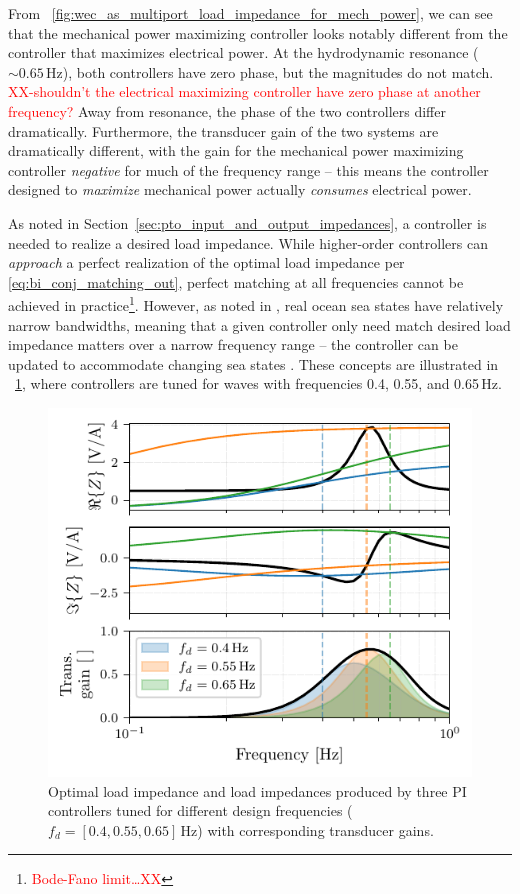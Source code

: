 \documentclass[lettersize,journal]{IEEEtran}
\newcommand{\rc}[1]{\textcolor{red}{#1}}
\begin{document}
\noindent{}From \figurename~\ref{fig:wec_as_multiport_load_impedance_for_mech_power}, we can see that the mechanical power maximizing controller looks notably different from the controller that maximizes electrical power.
At the hydrodynamic resonance ($\sim 0.65$\,Hz), both controllers have zero phase, but the magnitudes do not match.
\rc{XX-shouldn't the electrical maximizing controller have zero phase at another frequency?}
Away from resonance, the phase of the two controllers differ dramatically.
Furthermore, the transducer gain of the two systems are dramatically different, with the gain for the mechanical power maximizing controller \emph{negative} for much of the frequency range -- this means the controller designed to \emph{maximize} mechanical power actually \emph{consumes} electrical power.

As noted in Section~\ref{sec:pto_input_and_output_impedances}, a controller is needed to realize a desired load impedance.
While higher-order controllers can \emph{approach} a perfect realization of the optimal load impedance per \eqref{eq:bi_conj_matching_out}, perfect matching at all frequencies cannot be achieved in practice\footnote{\rc{Bode-Fano limit\dots{}XX}}.
However, as noted in \cite{Coe2020a}, real ocean sea states have relatively narrow bandwidths, meaning that a given controller only need match desired load impedance matters over a narrow frequency range -- the controller can be updated to accommodate changing sea states \cite{Forbush:2022aa}.
These concepts are illustrated in \figurename~\ref{fig:gfx/wec_as_multiport_pi_controllers_real_imag}, where controllers are tuned for waves with frequencies 0.4, 0.55, and 0.65\,Hz.

\begin{figure}[tb]
        \centering
        \includegraphics[width=1\columnwidth]{wec_as_multiport_pi_controllers_real_imag.pdf}
        \caption{Optimal load impedance and load impedances produced by three PI controllers tuned for different design frequencies ($f_d = [0.4, 0.55, 0.65]$\,Hz) with corresponding transducer gains.}
        \label{fig:gfx/wec_as_multiport_pi_controllers_real_imag}
\end{figure}
\end{document}
